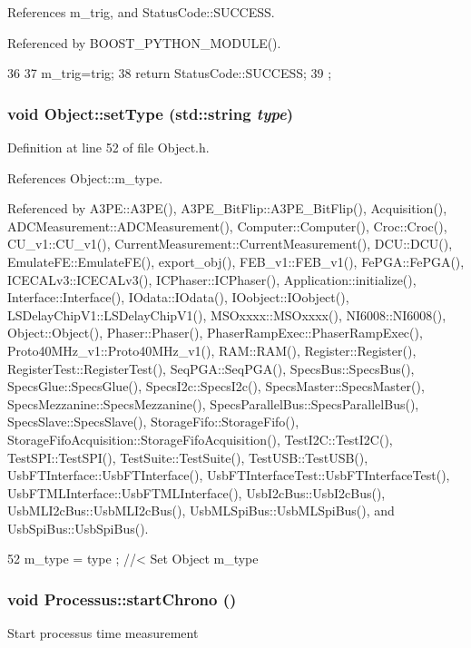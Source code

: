References m\_\-trig, and StatusCode::SUCCESS.

Referenced by BOOST\_\-PYTHON\_\-MODULE().


\begin{DoxyCode}
36                                    {
37     m_trig=trig; 
38     return StatusCode::SUCCESS;
39   };
\end{DoxyCode}
\hypertarget{classObject_aae534cc9d982bcb9b99fd505f2e103a5}{
\subsubsection[{setType}]{\setlength{\rightskip}{0pt plus 5cm}void Object::setType (std::string {\em type})}}
\label{classObject_aae534cc9d982bcb9b99fd505f2e103a5}


Definition at line 52 of file Object.h.

References Object::m\_\-type.

Referenced by A3PE::A3PE(), A3PE\_\-BitFlip::A3PE\_\-BitFlip(), Acquisition(), ADCMeasurement::ADCMeasurement(), Computer::Computer(), Croc::Croc(), CU\_\-v1::CU\_\-v1(), CurrentMeasurement::CurrentMeasurement(), DCU::DCU(), EmulateFE::EmulateFE(), export\_\-obj(), FEB\_\-v1::FEB\_\-v1(), FePGA::FePGA(), ICECALv3::ICECALv3(), ICPhaser::ICPhaser(), Application::initialize(), Interface::Interface(), IOdata::IOdata(), IOobject::IOobject(), LSDelayChipV1::LSDelayChipV1(), MSOxxxx::MSOxxxx(), NI6008::NI6008(), Object::Object(), Phaser::Phaser(), PhaserRampExec::PhaserRampExec(), Proto40MHz\_\-v1::Proto40MHz\_\-v1(), RAM::RAM(), Register::Register(), RegisterTest::RegisterTest(), SeqPGA::SeqPGA(), SpecsBus::SpecsBus(), SpecsGlue::SpecsGlue(), SpecsI2c::SpecsI2c(), SpecsMaster::SpecsMaster(), SpecsMezzanine::SpecsMezzanine(), SpecsParallelBus::SpecsParallelBus(), SpecsSlave::SpecsSlave(), StorageFifo::StorageFifo(), StorageFifoAcquisition::StorageFifoAcquisition(), TestI2C::TestI2C(), TestSPI::TestSPI(), TestSuite::TestSuite(), TestUSB::TestUSB(), UsbFTInterface::UsbFTInterface(), UsbFTInterfaceTest::UsbFTInterfaceTest(), UsbFTMLInterface::UsbFTMLInterface(), UsbI2cBus::UsbI2cBus(), UsbMLI2cBus::UsbMLI2cBus(), UsbMLSpiBus::UsbMLSpiBus(), and UsbSpiBus::UsbSpiBus().


\begin{DoxyCode}
52 { m_type  = type  ; } //< Set Object m_type
\end{DoxyCode}
\hypertarget{classProcessus_a5e4d34b86241fa0756e07375a14ff4b2}{
\subsubsection[{startChrono}]{\setlength{\rightskip}{0pt plus 5cm}void Processus::startChrono ()}}
\label{classProcessus_a5e4d34b86241fa0756e07375a14ff4b2}
Start processus time measurement 

